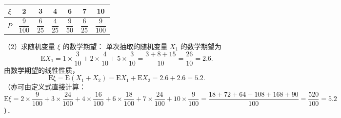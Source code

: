 \begin{answer}
\begin{center}
\begin{tabular}{ccccccc}
\toprule
$\xi$ & 2 & 3 & 4 & 6 & 7 & 10 \\
\midrule
$P$ & $\dfrac{9}{100}$ & $\dfrac{6}{25}$ & $\dfrac{4}{25}$ & $\dfrac{9}{50}$ & $\dfrac{6}{25}$ & $\dfrac{9}{100}$ \\
\bottomrule
\end{tabular}
\end{center}

（2）求随机变量 $\xi$ 的数学期望：
单次抽取的随机变量 $X_1$ 的数学期望为
\nopagebreak[4]
\[
\mathrm{E}X_1 = 1 \times \frac{3}{10} + 2 \times \frac{4}{10} + 5 \times \frac{3}{10} = \frac{3 + 8 + 15}{10} = \frac{26}{10} = 2.6.
\]
由数学期望的线性性质，
\nopagebreak[4]
\[
\mathrm{E}\xi = \mathrm{E}(X_1 + X_2) = \mathrm{E}X_1 + \mathrm{E}X_2 = 2.6 + 2.6 = 5.2.
\]
（亦可由定义式直接计算：$\mathrm{E}\xi = 2 \times \dfrac{9}{100} + 3 \times \dfrac{24}{100} + 4 \times \dfrac{16}{100} + 6 \times \dfrac{18}{100} + 7 \times \dfrac{24}{100} + 10 \times \dfrac{9}{100} = \dfrac{18 + 72 + 64 + 108 + 168 + 90}{100} = \dfrac{520}{100} = 5.2$）．


\end{answer}
